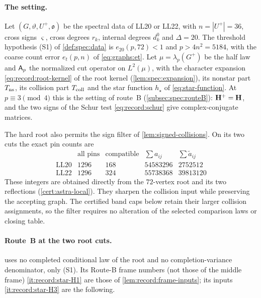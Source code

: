 \paragraph{The setting.}
Let $(G,\vartheta,U^+,\mathfrak o)$ be the spectral data of LL20 or LL22, with
$n=|U^+|=36$, cross signs $\varsigma$, cross degrees $r_k$, internal degrees
$d^0_k$ and $\Delta=20$. The threshold hypothesis (S1) of \cref{def:spec:data}
is $e_{20}(p,72)<1$ and $p>4n^2=5184$, with the coarse count error $e_t(p,n)$ of
\eqref{eq:graphs:et}. Let $\mu=\lambda_p(G^+)$ be the half law and $\mathsf A_p$ the
normalized cut operator on $L^2(\mu)$, with the character expansion
\eqref{eq:record:root-kernel} of the root kernel (\cref{lem:spec:expansion}), its
nonstar part $T_{\rm ns}$, its collision part $T_{\rm coll}$ and the star function
$h_\star$ of \eqref{eq:star-function}. At $p\equiv3\pmod4$ this is the setting of
route~B (\cref{subsec:spec:routeB}): $\mathbf H^+=\mathbf H$, and the two signs of the Schur
test \eqref{eq:record:schur} give complex-conjugate matrices.

The hard root also permits the sign filter of
\cref{lem:signed-collisions}. On its two cuts the exact pin counts are
\begin{equation}\label{eq:upper-signed-collision-counts}
\begin{array}{c|r|r|r|r}
 &\text{all pins}&\text{compatible}&\sum a_{ij}&\sum\widetilde a_{ij}\\ \hline
 \mathrm{LL20}&1296&168&54583296&2752512\\
 \mathrm{LL22}&1296&324&55738368&39813120
\end{array}
\end{equation}
These integers are obtained directly from the $72$-vertex root and
its two reflections (\cref{cert:astra-local}). They sharpen the collision input while preserving
the accepting graph. The certified band caps below retain their
larger collision assignments, so the filter requires no alteration
of the selected comparison laws or closing table.

\paragraph{Route~B at the two root cuts.}
 uses no completed conditional law of the root and no
completion-variance denominator, only (S1). Its Route-B frame numbers
(not those of the middle frame)
\ref{it:record:star-H1} are those of \cref{lem:record:frame-inputs}; its inputs
\ref{it:record:star-H3} are the following.

